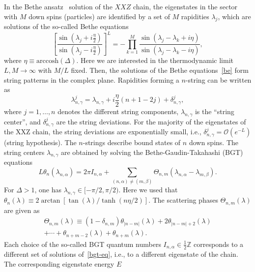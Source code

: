 \documentclass[twocolumn,superscriptaddress,prb,10pt]{revtex4-1}
\begin{document}
In the Bethe ansatz~\cite{taka-book} solution of the $XXZ$ chain, the eigenstates 
in the sector with $M$ down spins (particles) are identified by  
a set of $M$ rapidities $\lambda_j$, which are solutions of the so-called Bethe 
equations~\cite{taka-book} 
%
\begin{equation}
\label{be}
\left[\frac{\sin(\lambda_j+i\frac{\eta}{2})}{\sin(\lambda_j-i\frac{\eta}{2})}\right]^L=
-\prod\limits_{k=1}^M\frac{\sin(\lambda_j-\lambda_k+i\eta)}{\sin(\lambda_j-\lambda_k-i
\eta)},
\end{equation}
%
where $\eta\equiv\textrm{arccosh}(\Delta)$. 
% 
Here we are interested in the thermodynamic limit $L,M\to\infty$ with $M/L$ fixed. 
Then, the solutions of the Bethe equations~\eqref{be} form string patterns in the 
complex plane. Rapidities forming a $n$-string can be written as 
%
\begin{equation}
\lambda^j_{n,\gamma}=\lambda_{n,\gamma}+i\frac{\eta}{2}(n+1-2j)+\delta^j_{n,\gamma}, 
\end{equation}
%
where $j=1,\dots,n$ denotes the different string 
components, $\lambda_{n,\gamma}$ is the ``string center'', and $\delta_{n,\gamma}^j$ 
are the string deviations. For the majority of the eigenstates 
of the XXZ chain, the string deviations are exponentially small, i.e., 
$\delta_{n,\gamma}^j={\mathcal O}(e^{-L})$ (string hypothesis). The 
$n$-strings describe bound states of $n$ down spins. The string centers 
$\lambda_{n,\gamma}$ are obtained by solving the Bethe-Gaudin-Takahashi (BGT) 
equations~\cite{taka-book} 
%
\begin{equation}
\label{bgt-eq}
L\theta_n(\lambda_{n,\alpha})=2\pi I_{n,\alpha}+\sum\limits_{(n,\alpha)
\ne(m,\beta)}\Theta_{n,m}(\lambda_{n,\alpha}-
\lambda_{m,\beta}). 
\end{equation}
%
For $\Delta>1$, one has $\lambda_{n,\gamma}\in[-\pi/2,\pi/2)$. Here we used that $\theta_n(
\lambda)\equiv2\arctan[\tan(\lambda)/\tanh(n\eta/2)]$. The scattering phases $\Theta_{n,m}
(\lambda)$ are given as 
%
\begin{multline}
\label{Theta}
\Theta_{n,m}(\lambda)\equiv(1-\delta_{n,m})\theta_{|n-m|}(\lambda)+2\theta_{
|n-m|+2}(\lambda)\\+\cdots+\theta_{n+m-2}(\lambda)+\theta_{n+m}(\lambda). 
\end{multline}
%
Each choice of the so-called BGT quantum numbers $I_{n,\alpha}\in\frac{1}{2}
\mathbb{Z}$ corresponds to a different set of solutions of~\eqref{bgt-eq}, i.e., 
to a  different eigenstate of the chain. The corresponding eigenstate energy $E$ 
\end{document}
